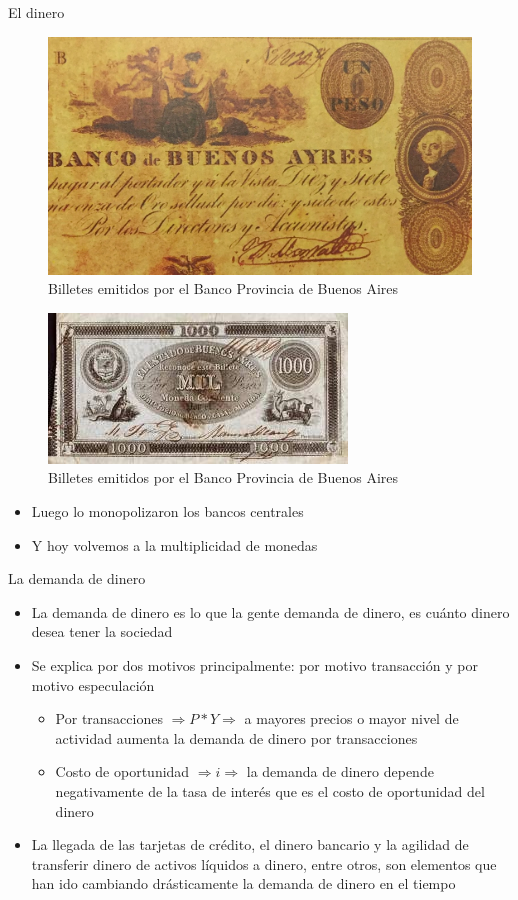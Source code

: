\documentclass{beamer}
\begin{document}
\begin{frame}{El dinero}
        \begin{figure} [H]   
  \centering
  \includegraphics[width=.35\textwidth]{Slides Principios de Economia/Figures/C32.4.jpg}
      \caption{Billetes emitidos por el Banco Provincia de Buenos Aires}
  \label{fig:C32.4}
\end{figure}

\begin{figure} [H]   
\centering\includegraphics[width=.35\textwidth]{Slides Principios de Economia/Figures/C32.5.jpg}
\caption{Billetes emitidos por el Banco Provincia de Buenos Aires}
\end{figure}
       \begin{itemize}
           \item  Luego lo monopolizaron los bancos centrales
    \item Y hoy volvemos a la multiplicidad de monedas 
       \end{itemize}     
        \end{frame}


\begin{frame}{La demanda de dinero}
    \begin{itemize}
        \item La demanda de dinero es lo que la gente demanda de dinero, es cuánto dinero desea tener la sociedad
        \item Se explica por dos motivos principalmente: por motivo transacción y por motivo especulación
        \begin{itemize}
        \item Por transacciones $\Rightarrow P*Y \Rightarrow$ a mayores precios o mayor nivel de actividad aumenta la demanda de dinero por transacciones
        \item Costo de oportunidad $\Rightarrow i \Rightarrow $ la demanda de dinero depende negativamente de la tasa de interés que es el costo de oportunidad del dinero
    \end{itemize}
    \item La llegada de las tarjetas de crédito, el dinero bancario y la agilidad de transferir dinero de activos líquidos a dinero, entre otros, son elementos que han ido cambiando drásticamente la demanda de dinero en el tiempo
    \end{itemize}
\end{frame}
\end{document}
